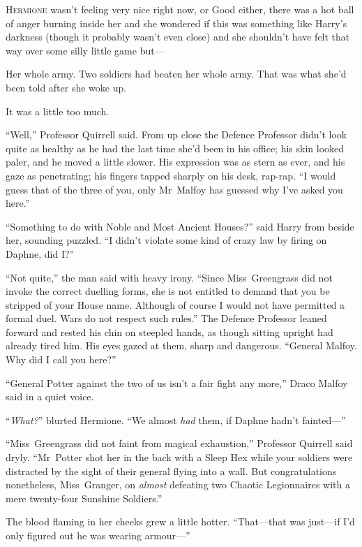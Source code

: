 
\lettrine{H}{ermione} wasn’t feeling very nice right now, or Good either, there was a hot ball of anger burning inside her and she wondered if this was something like Harry’s darkness (though it probably wasn’t even close) and she shouldn’t have felt that way over some silly little game but—

Her whole army. Two soldiers had beaten her whole army. That was what she’d been told after she woke up.

It was a little too much.

“Well,” Professor Quirrell said. From up close the Defence Professor didn’t look quite as healthy as he had the last time she’d been in his office; his skin looked paler, and he moved a little slower. His expression was as stern as ever, and his gaze as penetrating; his fingers tapped sharply on his desk, rap-rap. “I would guess that of the three of you, only Mr~Malfoy has guessed why I’ve asked you here.”

“Something to do with Noble and Most Ancient Houses?” said Harry from beside her, sounding puzzled. “I didn’t violate some kind of crazy law by firing on Daphne, did I?”

“Not quite,” the man said with heavy irony. “Since Miss~Greengrass did not invoke the correct duelling forms, she is not entitled to demand that you be stripped of your House name. Although of course I would not have permitted a formal duel. Wars do not respect such rules.” The Defence Professor leaned forward and rested his chin on steepled hands, as though sitting upright had already tired him. His eyes gazed at them, sharp and dangerous. “General Malfoy. Why did I call you here?”

“General Potter against the two of us isn’t a fair fight any more,” Draco Malfoy said in a quiet voice.

“\emph{What?}” blurted Hermione. “We almost \emph{had} them, if Daphne hadn’t fainted—”

“Miss~Greengrass did not faint from magical exhaustion,” Professor Quirrell said dryly. “Mr~Potter shot her in the back with a Sleep Hex while your soldiers were distracted by the sight of their general flying into a wall. But congratulations nonetheless, Miss~Granger, on \emph{almost} defeating two Chaotic Legionnaires with a mere twenty-four Sunshine Soldiers.”

The blood flaming in her cheeks grew a little hotter. “That—that was just—if I’d only figured out he was wearing armour—”

